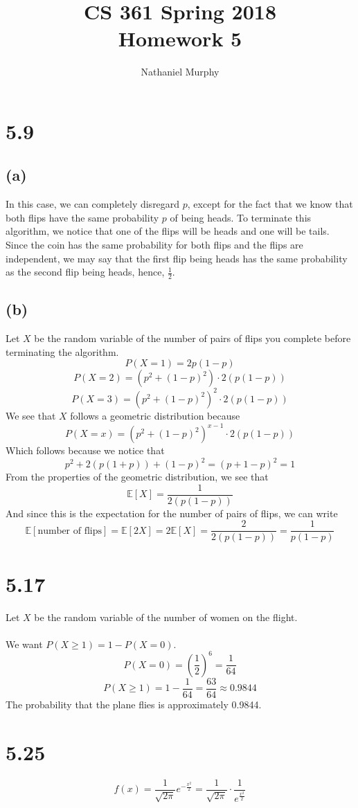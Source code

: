 \documentclass[11pt]{article}
\title{\textbf{CS 361 Spring 2018\\Homework 5}}
\author{Nathaniel Murphy}
\date{}
\begin{document}
\maketitle

\section*{5.9}
\subsection*{(a)}
In this case, we can completely disregard $p$, except for the fact that we know that both flips have the same probability $p$ of being heads. To terminate this algorithm, we notice that one of the flips will be heads and one will be tails. Since the coin has the same probability for both flips and the flips are independent, we may say that the first flip being heads has the same probability as the second flip being heads, hence, $\frac{1}{2}$.
\subsection*{(b)}
Let $X$ be the random variable of the number of pairs of flips you complete before terminating the algorithm.
\[P(X=1)=2p(1-p)\]
\[P(X=2)=(p^2+(1-p)^2) \cdot 2(p(1-p))\]
\[P(X=3)=(p^2+(1-p)^2)^2\cdot 2(p(1-p))\]
We see that $X$ follows a geometric distribution because
\[P(X=x)=(p^2+(1-p)^2)^{x-1}\cdot 2(p(1-p))\]
Which follows because we notice that
\[p^2+2(p(1+p))+(1-p)^2=(p+1-p)^2=1\]
From the properties of the geometric distribution, we see that
\[\mathbb{E}[X]=\frac{1}{2(p(1-p))}\]
And since this is the expectation for the number of pairs of flips, we can write
\[\mathbb{E}[\text{number of flips}]=\mathbb{E}[2X]=2\mathbb{E}[X]=\frac{2}{2(p(1-p))}=\frac{1}{p(1-p)}\]

\section*{5.17}
Let $X$ be the random variable of the number of women on the flight. \\ \\
We want $P(X\geq1)=1-P(X=0)$.
\[P(X=0)=\left(\frac{1}{2}\right)^6=\frac{1}{64}\]
\[P(X\geq1)=1-\frac{1}{64}=\frac{63}{64}\approx0.9844\]
The probability that the plane flies is approximately 0.9844.

\section*{5.25}
\[f(x)=\frac{1}{\sqrt{2\pi}}e^{-\frac{x^2}{2}}=\frac{1}{\sqrt{2\pi}}\cdot\frac{1}{e^{\frac{x^2}{2}}}\]
\end{document}
